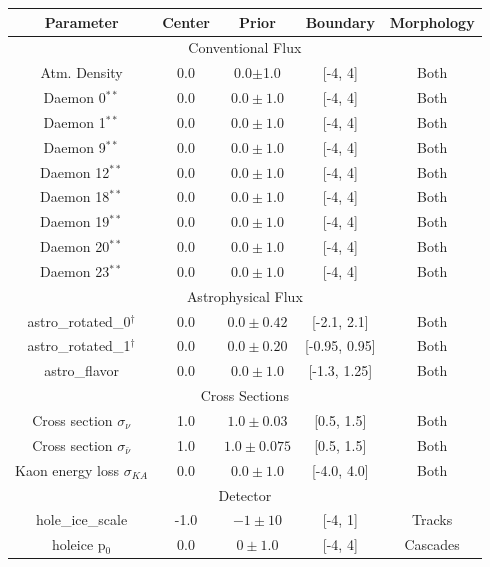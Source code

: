 \documentclass[main.tex]{subfiles}
\begin{document}
\begin{table}
    \centering
    \begin{tabular}{c | cccc}\rowcolor{blue!25}
        {\large \textbf{Parameter}} & {\large \textbf{Center}} & {\large \textbf{Prior}} & {\large \textbf{Boundary}}& {\large \textbf{Morphology}} \\ \hline
        \multicolumn{5}{c}{Conventional Flux} \\\hline
        Atm. Density & 0.0 & 0.0$\pm$1.0 & [-4, 4] & Both \\
        Daemon 0$^{**}$  & 0.0 & $0.0\pm1.0$ & [-4, 4]& Both  \\
        Daemon 1$^{**}$  & 0.0 & $0.0\pm1.0$ & [-4, 4]& Both  \\
        Daemon 9$^{**}$  & 0.0 & $0.0\pm1.0$ & [-4, 4]& Both  \\
        Daemon 12$^{**}$  & 0.0 & $0.0\pm1.0$ & [-4, 4]& Both  \\
        Daemon 18$^{**}$  & 0.0 & $0.0\pm1.0$ & [-4, 4]& Both  \\
        Daemon 19$^{**}$  & 0.0 & $0.0\pm1.0$ & [-4, 4]& Both  \\
        Daemon 20$^{**}$  & 0.0 & $0.0\pm1.0$ & [-4, 4]& Both  \\
        Daemon 23$^{**}$  & 0.0 & $0.0\pm1.0$ & [-4, 4]& Both  \\
        \multicolumn{5}{c}{Astrophysical Flux} \\\hline
        astro\_rotated\_0$^{\dag}$ & 0.0 & $0.0\pm 0.42 $ & [-2.1, 2.1]&Both  \\
        astro\_rotated\_1$^{\dag}$ & 0.0 & $0.0\pm0.20$ & [-0.95, 0.95]&Both  \\
        astro\_flavor & 0.0 & $0.0\pm1.0$ & [-1.3, 1.25] & Both \\
        \multicolumn{5}{c}{Cross Sections} \\\hline
        Cross section $\sigma_{\nu}$ & 1.0 & $1.0\pm0.03$ & [0.5, 1.5]& Both \\
        Cross section $\sigma_{\bar{\nu}}$ & 1.0 & $1.0\pm0.075$ & [0.5, 1.5]& Both \\
        Kaon energy loss $\sigma_{KA}$ & 0.0 & $0.0\pm1.0$ & [-4.0, 4.0]& Both \\
        \multicolumn{5}{c}{Detector} \\\hline 
        hole\_ice\_scale & -1.0 & $-1\pm10$ & [-4, 1]&Tracks  \\
        holeice p$_{0}$ & 0.0 & $0\pm 1.0$ & [-4, 4]&Cascades \\

\end{tabular}
\end{table}
\end{document}
